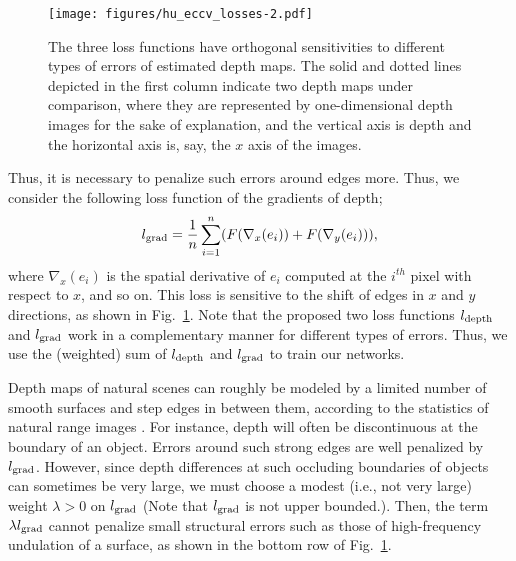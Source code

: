 \documentclass[10pt,twocolumn,letterpaper]{article}
\begin{document}
\begin{figure}[t]
\centering
\texttt{[image: figures/hu\_eccv\_losses-2.pdf]}
\caption{The three loss functions have orthogonal sensitivities to different types of errors of estimated depth maps. The solid and dotted lines depicted in the first column indicate two depth maps under comparison, where they are represented by one-dimensional depth images for the sake of explanation, and the vertical axis is depth and the horizontal axis is, say, the $x$ axis of the images.}
\label{fig:losses}
\end{figure}

Thus, it is necessary to penalize such errors around edges more. Thus, we consider the following loss function of the gradients of depth;
\begin{equation}
    l_{\rm grad}=\frac{1}{n}\sum_{i=1}^n (F(\nabla_{x}(e_i))+F(\nabla_{y}(e_i))),
\end{equation}
where $\nabla_{x}(e_{i})$ is the spatial derivative of $e_{i}$ computed at the $i^{th}$ pixel with respect to $x$, and so on. This loss is sensitive to the shift of edges in $x$ and $y$ directions, as shown in Fig.~\ref{fig:losses}. Note that the proposed two loss functions $l_{\rm depth}$ and $l_{\rm grad}$ work in a complementary manner for different types of errors. Thus, we use the (weighted) sum of $l_{\rm depth}$ and $l_{\rm grad}$ to train our networks. 

Depth maps of natural scenes can roughly be modeled by a limited number of smooth surfaces and step edges in between them, according to the statistics of natural range images \cite{huang2000statistics}. For instance, depth will often be discontinuous at the boundary of an object. Errors around such strong edges are well penalized by $l_{\rm grad}$. However, since depth differences at such occluding boundaries of objects can sometimes be very large, we must choose a modest (i.e., not very large) weight $\lambda >0$ on $l_{\rm grad}$ (Note that $l_{\rm grad}$ is not upper bounded.). Then, the term $\lambda l_{\rm grad}$ cannot penalize small structural errors such as those of high-frequency undulation of a surface, as shown in the bottom row of Fig.~\ref{fig:losses}.
\end{document}
